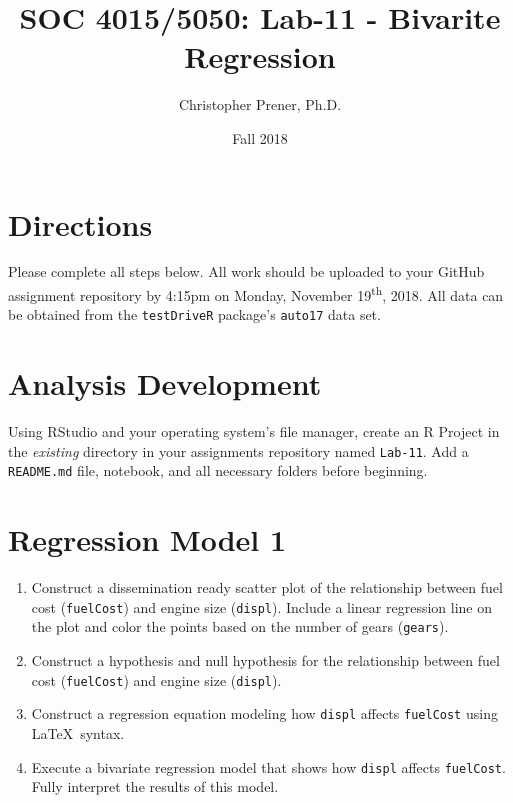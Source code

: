 \documentclass{tufte-handout}
\title{SOC 4015/5050: Lab-11 - Bivarite Regression}
\author{Christopher Prener, Ph.D.}
\date{Fall 2018}
\begin{document}

\maketitle %


\vspace{5mm}
\section{Directions}
Please complete all steps below. All work should be uploaded to your GitHub assignment repository by 4:15pm on Monday, November 19\textsuperscript{th}, 2018. All data can be obtained from the \texttt{testDriveR} package's \texttt{auto17} data set.

\vspace{5mm}
\section{Analysis Development}
Using RStudio and your operating system's file manager, create an R Project in the \textit{existing} directory in your assignments repository named \texttt{Lab-11}. Add a \texttt{README.md} file, notebook, and all necessary folders before beginning.

\vspace{3mm}
\section{Regression Model 1}
\begin{enumerate}
\item Construct a dissemination ready scatter plot of the relationship between fuel cost (\texttt{fuelCost}) and engine size (\texttt{displ}). Include a linear regression line on the plot and color the points based on the number of gears (\texttt{gears}). 
\item Construct a hypothesis and null hypothesis for the relationship between fuel cost (\texttt{fuelCost}) and engine size (\texttt{displ}).
\item Construct a regression equation modeling how \texttt{displ} affects \texttt{fuelCost} using \LaTeX{}\ syntax.
\item Execute a bivariate regression model that shows how \texttt{displ} affects \texttt{fuelCost}. Fully interpret the results of this model.
\end{enumerate}
\end{document}

